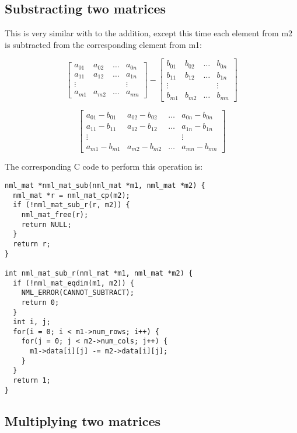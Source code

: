 \subsection{Substracting two matrices}

This is very similar with to the addition, except this time each element from m2 is subtracted from the corresponding element from m1:

$$
\left[ \begin{array}{cccc}
a_{01} & a_{02} & \ldots & a_{0n} \\
a_{11} & a_{12} & \ldots & a_{1n} \\
\vdots &&& \vdots \\
a_{m1} & a_{m2} & \ldots & a_{mn}
\end{array} \right]
-
\left[ \begin{array}{cccc}
b_{01} & b_{02} & \ldots & b_{0n} \\
b_{11} & b_{12} & \ldots & b_{1n} \\
\vdots &&& \vdots \\
b_{m1} & b_{m2} & \ldots & b_{mn}
\end{array} \right]
$$

$$
\left[ \begin{array}{cccc}
a_{01}-b_{01} & a_{02}-b_{02} & \ldots & a_{0n}-b_{0n} \\
a_{11}-b_{11} & a_{12}-b_{12} & \ldots & a_{1n}-b_{1n} \\
\vdots &&& \vdots \\
a_{m1}-b_{m1} & a_{m2}-b_{m2} & \ldots & a_{mn}-b_{mn}
\end{array} \right]
$$

The corresponding C code to perform this operation is:

\begin{verbatim}
nml_mat *nml_mat_sub(nml_mat *m1, nml_mat *m2) {
  nml_mat *r = nml_mat_cp(m2);
  if (!nml_mat_sub_r(r, m2)) {
    nml_mat_free(r);
    return NULL;
  }
  return r;
}

int nml_mat_sub_r(nml_mat *m1, nml_mat *m2) {
  if (!nml_mat_eqdim(m1, m2)) {
    NML_ERROR(CANNOT_SUBTRACT);
    return 0;
  }
  int i, j;
  for(i = 0; i < m1->num_rows; i++) {
    for(j = 0; j < m2->num_cols; j++) {
      m1->data[i][j] -= m2->data[i][j];
    }
  }
  return 1;
} 
\end{verbatim}

\subsection{Multiplying two matrices}

